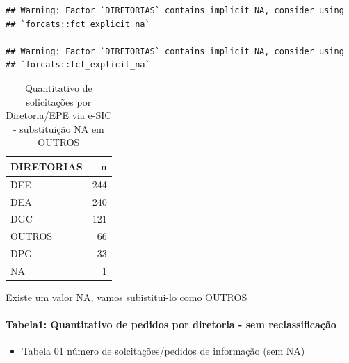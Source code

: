 \documentclass[]{article}
\newenvironment{Shaded}{\begin{snugshade}}{\end{snugshade}}
\newcommand{\DataTypeTok}[1]{\textcolor[rgb]{0.13,0.29,0.53}{#1}}
\newcommand{\KeywordTok}[1]{\textcolor[rgb]{0.13,0.29,0.53}{\textbf{#1}}}
\newcommand{\NormalTok}[1]{#1}
\newcommand{\OperatorTok}[1]{\textcolor[rgb]{0.81,0.36,0.00}{\textbf{#1}}}
\newcommand{\StringTok}[1]{\textcolor[rgb]{0.31,0.60,0.02}{#1}}
\providecommand{\tightlist}{%
  \setlength{\itemsep}{0pt}\setlength{\parskip}{0pt}}
\let\oldparagraph\paragraph
\renewcommand{\paragraph}[1]{\oldparagraph{#1}\mbox{}}
\begin{document}
\begin{verbatim}
## Warning: Factor `DIRETORIAS` contains implicit NA, consider using
## `forcats::fct_explicit_na`

## Warning: Factor `DIRETORIAS` contains implicit NA, consider using
## `forcats::fct_explicit_na`
\end{verbatim}

\begin{table}[!h]

\caption{\label{tab:unnamed-chunk-20}Quantitativo de solicitações por Diretoria/EPE via e-SIC - substituição NA em OUTROS}
\centering
\begin{tabular}{lr}
\toprule
DIRETORIAS & n\\
\midrule
\rowcolor{gray!6}  DEE & 244\\
DEA & 240\\
\rowcolor{gray!6}  DGC & 121\\
OUTROS & 66\\
\rowcolor{gray!6}  DPG & 33\\
\addlinespace
NA & 1\\
\bottomrule
\end{tabular}
\end{table}

Existe um valor NA, vamos subistitui-lo como OUTROS

\begin{Shaded}
\end{Shaded}

\hypertarget{tabela1-quantitativo-de-pedidos-por-diretoria---sem-reclassificacao}{%
\paragraph{Tabela1: Quantitativo de pedidos por diretoria - sem
reclassificação}\label{tabela1-quantitativo-de-pedidos-por-diretoria---sem-reclassificacao}}

\begin{itemize}
\tightlist
\item
  Tabela 01 número de solcitações/pedidos de informação (sem NA)
\end{itemize}
\end{document}
